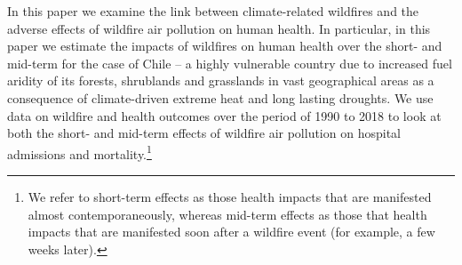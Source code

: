 \documentclass[11pt]{article}
\begin{document}
\begin{spacing}{1.5}
In this paper we examine the link between climate-related wildfires and the adverse effects of wildfire air pollution on human health. In particular, in this paper we estimate the impacts of wildfires on human health over the short- and mid-term for the case of Chile -- a highly vulnerable country due to increased fuel aridity of its forests, shrublands and grasslands in vast geographical areas as a consequence of climate-driven extreme heat and long lasting droughts. We use data on wildfire and health outcomes over the period of 1990 to 2018 to look at both the short- and mid-term effects of wildfire air pollution on hospital admissions and mortality.\footnote{We refer to short-term effects as those health impacts that are manifested almost contemporaneously, whereas mid-term effects as those that health impacts that are manifested soon after a wildfire event (for example, a few weeks later).}




\end{spacing}
\end{document}
